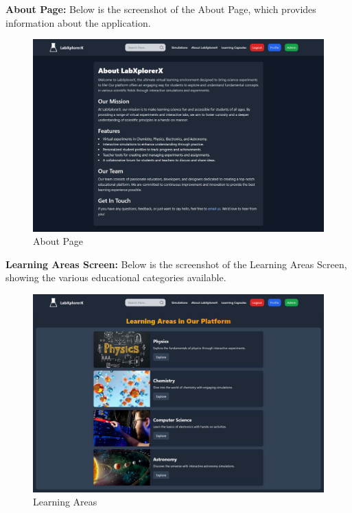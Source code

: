\textbf{About Page:} Below is the screenshot of the About Page, which provides information about the application.
\begin{figure}[H]
    \centering
    \includegraphics[width = 16cm]{Diagrams/output/about.png}
    \caption{About Page}
\end{figure}
\newpage

\textbf{Learning Areas Screen:} Below is the screenshot of the Learning Areas Screen, showing the various educational categories available.
\begin{figure}[H]
    \centering
    \includegraphics[width = 15cm]{Diagrams/output/learningareas.png}
    \caption{Learning Areas}
\end{figure}

